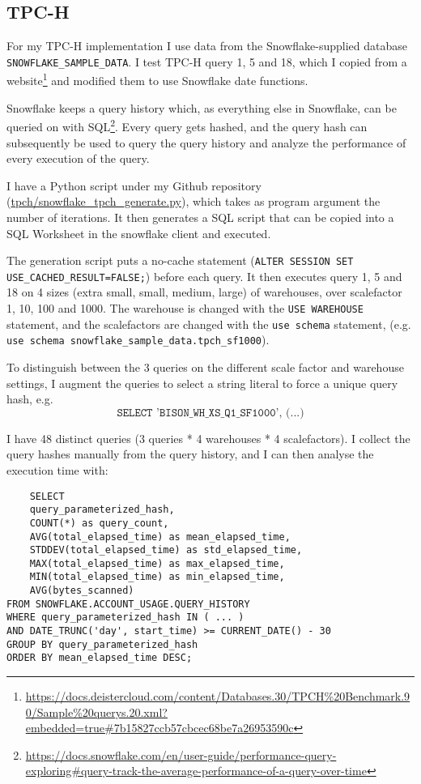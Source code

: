 \documentclass{article}
\begin{document}
\subsection{TPC-H}
For my TPC-H implementation I use data from the Snowflake-supplied database \texttt{SNOWFLAKE\_SAMPLE\_DATA}. I test TPC-H query 1, 5 and 18, which I copied from a website\footnote{\url{https://docs.deistercloud.com/content/Databases.30/TPCH\%20Benchmark.90/Sample\%20querys.20.xml?embedded=true\#7b15827ccb57cbcec68be7a26953590c}} and modified them to use Snowflake date functions. 

\medskip \noindent Snowflake keeps a query history which, as everything else in Snowflake, can be queried on with SQL\footnote{\url{https://docs.snowflake.com/en/user-guide/performance-query-exploring#query-track-the-average-performance-of-a-query-over-time}}. Every query gets hashed, and the query hash can subsequently be used to query the query history and analyze the performance of every execution of the query.

\medskip \noindent I have a Python script under my Github repository (\url{tpch/snowflake_tpch_generate.py}), which takes as program argument the number of iterations. It then generates a SQL script that can be copied into a SQL Worksheet in the snowflake client and executed. 

\medskip \noindent The generation script puts a no-cache statement (\texttt{ALTER SESSION SET USE\_CACHED\_RESULT=FALSE;}) before each query. It then executes query 1, 5 and 18 on 4 sizes (extra small, small, medium, large) of warehouses, over scalefactor 1, 10, 100 and 1000. The warehouse is changed with the \texttt{USE WAREHOUSE} statement, and the scalefactors are changed with the \texttt{use schema} statement, (e.g. \texttt{use schema snowflake\_sample\_data.tpch\_sf1000}).

\medskip \noindent To distinguish between the 3 queries on the different scale factor and warehouse settings, I augment the queries to select a string literal to force a unique query hash, e.g. $$ \texttt{SELECT 'BISON\_WH\_XS\_Q1\_SF1000', (...)} $$

\medskip \noindent I have 48 distinct queries (3 queries * 4 warehouses * 4 scalefactors). I collect the query hashes manually from the query history, and I can then analyse the execution time with: 

\begin{verbatim}
    SELECT 
    query_parameterized_hash,
    COUNT(*) as query_count,
    AVG(total_elapsed_time) as mean_elapsed_time,
    STDDEV(total_elapsed_time) as std_elapsed_time,
    MAX(total_elapsed_time) as max_elapsed_time,
    MIN(total_elapsed_time) as min_elapsed_time,
    AVG(bytes_scanned)
FROM SNOWFLAKE.ACCOUNT_USAGE.QUERY_HISTORY
WHERE query_parameterized_hash IN ( ... )
AND DATE_TRUNC('day', start_time) >= CURRENT_DATE() - 30
GROUP BY query_parameterized_hash
ORDER BY mean_elapsed_time DESC;
\end{verbatim}
\end{document}
